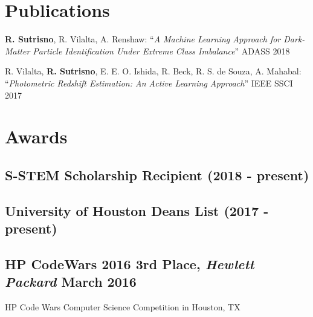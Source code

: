 \documentclass{article}
\begin{document}
\section{Publications}
\noindent \textbullet \textbf{R. Sutrisno}, R. Vilalta, A. Renshaw:
``\textit{A Machine Learning Approach for Dark-Matter Particle Identification Under Extreme Class Imbalance}'' ADASS 2018

\noindent \textbullet R. Vilalta, \textbf{R. Sutrisno}, E. E. O. Ishida, R. Beck, R. S. de Souza, A. Mahabal:
``\textit{Photometric Redshift Estimation: An Active Learning Approach}'' IEEE SSCI 2017


\section{Awards}
\subsection{S-STEM Scholarship Recipient (2018 - present)}
\subsection{University of Houston Deans List (2017 - present)}
\subsection{HP CodeWars 2016 3rd Place, \textit{Hewlett Packard} March 2016}
HP Code Wars Computer Science Competition in Houston, TX
\end{document}
